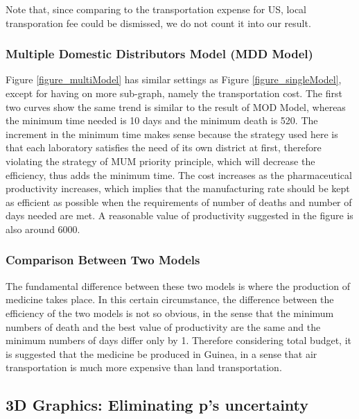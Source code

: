 \documentclass[12pt,a4paper,titlepage]{article}
\begin{document}
Note that, since comparing to the transportation expense for US, local transporation fee could be dismissed, we do not count it into our result.

\subsubsection{Multiple Domestic Distributors Model (MDD Model)}
\label{section_testMultiModel}

Figure \ref{figure_multiModel} has similar settings as Figure \ref{figure_singleModel}, except for having on more sub-graph, namely the transportation cost. The first two curves show the same trend is similar to the result of MOD Model, whereas the minimum time needed is 10 days and the minimum death is 520. The increment in the minimum time makes sense because the strategy used here is that each laboratory satisfies the need of its own district at first, therefore violating the strategy of MUM priority principle, which will decrease the efficiency, thus adds the minimum time. The cost increases as the pharmaceutical productivity increases, which implies that the manufacturing rate should be kept as efficient as possible when the requirements of number of deaths and number of days needed are met. A reasonable value of productivity suggested in the figure is also around 6000.

\subsubsection{Comparison Between Two Models}
\label{section_compareModel}
The fundamental difference between these two models is where the production of medicine takes place. In this certain circumstance, the difference between the efficiency of the two models is not so obvious, in the sense that the minimum numbers of death and the best value of productivity are the same and the minimum numbers of days differ only by 1. Therefore considering total budget, it is suggested that the medicine be produced in Guinea, in a sense that air transportation is much more expensive than land transportation.

\subsection{3D Graphics: Eliminating p's uncertainty}
\label{section_3d}
\end{document}
